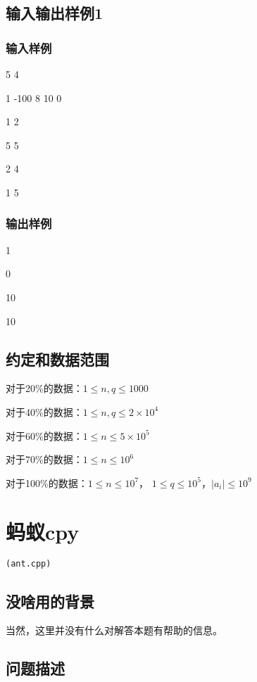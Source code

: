 \documentclass[UTF8]{ctexart}
\begin{document}
\subsection{输入输出样例1}

\subsubsection{输入样例}

5 4

1 -100 8 10 0

1 2

5 5

2 4

1 5

\subsubsection{输出样例}

1

0

10

10

\subsection{约定和数据范围}

对于20\%的数据：$1\le n,q \le 1000$

对于40\%的数据：$1\le n,q \le 2\times 10^4$

对于60\%的数据：$1\le n \le 5\times 10^5$

对于70\%的数据：$1\le n \le 10^6$

对于100\%的数据：$1 \le n \le 10^7$， $1\le q\le 10^5$，$|a_i| \le 10^9$

\newpage
\section{蚂蚁cpy}
\begin{center}
\tt\large{(ant.cpp)}
\end{center}

\subsection{没啥用的背景}



当然，这里并没有什么对解答本题有帮助的信息。

\subsection{问题描述}
\end{document}
